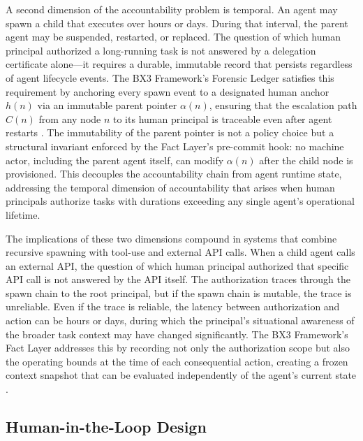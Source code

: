 A second dimension of the accountability problem is temporal. An agent may spawn a child that executes over hours or days. During that interval, the parent agent may be suspended, restarted, or replaced. The question of which human principal authorized a long-running task is not answered by a delegation certificate alone---it requires a durable, immutable record that persists regardless of agent lifecycle events. The BX3 Framework's Forensic Ledger satisfies this requirement by anchoring every spawn event to a designated human anchor $h(n)$ via an immutable parent pointer $\alpha(n)$, ensuring that the escalation path $C(n)$ from any node $n$ to its human principal is traceable even after agent restarts \cite{bx3framework2026}. The immutability of the parent pointer is not a policy choice but a structural invariant enforced by the Fact Layer's pre-commit hook: no machine actor, including the parent agent itself, can modify $\alpha(n)$ after the child node is provisioned. This decouples the accountability chain from agent runtime state, addressing the temporal dimension of accountability that arises when human principals authorize tasks with durations exceeding any single agent's operational lifetime.

The implications of these two dimensions compound in systems that combine recursive spawning with tool-use and external API calls. When a child agent calls an external API, the question of which human principal authorized that specific API call is not answered by the API itself. The authorization traces through the spawn chain to the root principal, but if the spawn chain is mutable, the trace is unreliable. Even if the trace is reliable, the latency between authorization and action can be hours or days, during which the principal's situational awareness of the broader task context may have changed significantly. The BX3 Framework's Fact Layer addresses this by recording not only the authorization scope but also the operating bounds at the time of each consequential action, creating a frozen context snapshot that can be evaluated independently of the agent's current state \cite{bx3framework2026}.


\subsection{Human-in-the-Loop Design}

